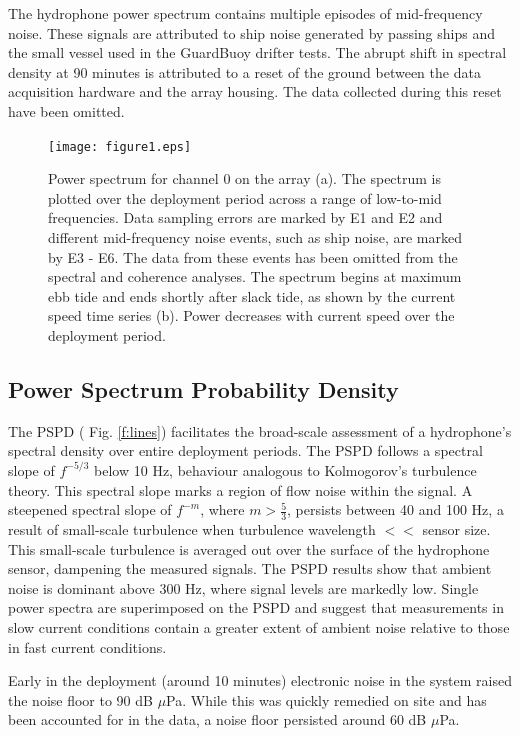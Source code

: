 \documentclass[12pt,journal,onecolumn]{IEEEtran}
\begin{document}
The hydrophone power spectrum contains multiple episodes of mid-frequency noise. These signals are attributed to ship noise generated by passing ships and the small vessel used in the GuardBuoy drifter tests. The abrupt shift in spectral density at 90 minutes is attributed to a reset of the ground between the data acquisition hardware and the array housing. The data collected during this reset have been omitted.

\begin{figure}[!t]
	\begin{center}	
		\texttt{[image: figure1.eps]} 
	\end{center}
	\caption[Hydrophone power spectra]{
	\label{f:power}
Power spectrum for channel 0 on the array (a). The spectrum is plotted over the deployment period across a range of low-to-mid frequencies. Data sampling errors are marked by E1 and E2 and different mid-frequency noise events, such as ship noise, are marked by E3 - E6. The data from these events has been omitted from the spectral and coherence analyses. The spectrum begins at maximum ebb tide and ends shortly after slack tide, as shown by the current speed time series (b). Power decreases with current  speed over the deployment period. }
\end{figure}

\subsection{Power Spectrum Probability Density}
The PSPD ( Fig. \ref{f:lines}) facilitates the broad-scale assessment of a hydrophone's spectral density over entire deployment periods. The PSPD follows a spectral slope of $f^{-5/3}$ below 10 Hz, behaviour analogous to Kolmogorov's turbulence theory. This spectral slope marks a region of flow noise within the signal. A steepened spectral slope of $f^{-m}$, where $m>\frac{5}{3}$, persists between 40 and 100 Hz, a result of small-scale turbulence when turbulence wavelength $<<$ sensor size. This small-scale turbulence is averaged out over the surface of the hydrophone sensor, dampening the measured signals. The PSPD results show that ambient noise is dominant above 300 Hz, where signal levels are markedly low. Single power spectra are superimposed on the PSPD and suggest that measurements in slow current conditions contain a greater extent of ambient noise relative to those in fast current conditions. 

Early in the deployment (around 10 minutes) electronic noise in the system raised the noise floor to 90 dB $\mu$Pa. While this was quickly remedied on site and has been accounted for in the data, a noise floor persisted around 60 dB $\mu$Pa. 
\end{document}
